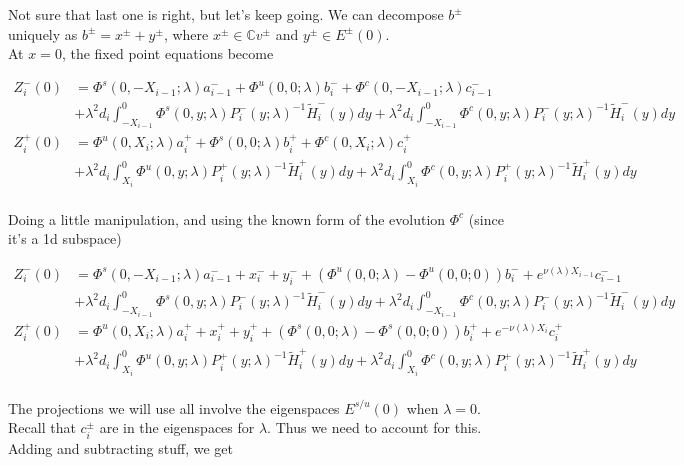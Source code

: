 \documentclass[12pt]{article}
\def\C{{\mathbb C}}
\begin{document}
Not sure that last one is right, but let's keep going. We can decompose $b^\pm$ uniquely as $b^\pm = x^\pm + y^\pm$, where $x^\pm \in \C v^\pm$ and $y^\pm \in E^\pm(0)$.\\

At $x = 0$, the fixed point equations become

\begin{align*}
Z_i^-(0) &= \Phi^s(0, -X_{i-1}; \lambda) a_{i-1}^- + \Phi^u(0, 0; \lambda) b_i^- + \Phi^c(0, -X_{i-1}; \lambda) c_{i-1}^- \\
&+ \lambda^2 d_i \int_{-X_{i-1}}^0 \Phi^s(0, y; \lambda) P_i^-(y; \lambda)^{-1} \tilde{H}_i^-(y) dy 
+ \lambda^2 d_i \int_{-X_{i-1}}^0 \Phi^c(0, y; \lambda) P_i^-(y; \lambda)^{-1} \tilde{H}_i^-(y) dy  \\ 
Z_i^+(0) &= \Phi^u(0, X_i; \lambda) a_i^+ + \Phi^s(0, 0; \lambda) b_i^+ + \Phi^c(0, X_i; \lambda) c_i^+ \\
&+ \lambda^2 d_i \int_{X_i}^0 \Phi^u(0, y; \lambda) P_i^+(y; \lambda)^{-1} \tilde{H}_i^+(y) dy 
+ \lambda^2 d_i \int_{X_i}^0 \Phi^c(0, y; \lambda) P_i^+(y; \lambda)^{-1} \tilde{H}_i^+(y) dy \\
\end{align*}

Doing a little manipulation, and using the known form of the evolution $\Phi^c$ (since it's a 1d subspace)

\begin{align*}
Z_i^-(0) &= \Phi^s(0, -X_{i-1}; \lambda) a_{i-1}^- + x_i^- + y_i^- + (\Phi^u(0, 0; \lambda) - \Phi^u(0, 0; 0))b_i^- + e^{\nu(\lambda) X_{i-1}} c_{i-1}^- \\
&+ \lambda^2 d_i \int_{-X_{i-1}}^0 \Phi^s(0, y; \lambda) P_i^-(y; \lambda)^{-1} \tilde{H}_i^-(y) dy 
+ \lambda^2 d_i \int_{-X_{i-1}}^0 \Phi^c(0, y; \lambda) P_i^-(y; \lambda)^{-1} \tilde{H}_i^-(y) dy  \\ 
Z_i^+(0) &= \Phi^u(0, X_i; \lambda) a_i^+ + x_i^+ + y_i^+ + (\Phi^s(0, 0; \lambda) - \Phi^s(0, 0; 0)) b_i^+ + e^{-\nu(\lambda)X_i} c_i^+ \\
&+ \lambda^2 d_i \int_{X_i}^0 \Phi^u(0, y; \lambda) P_i^+(y; \lambda)^{-1} \tilde{H}_i^+(y) dy 
+ \lambda^2 d_i \int_{X_i}^0 \Phi^c(0, y; \lambda) P_i^+(y; \lambda)^{-1} \tilde{H}_i^+(y) dy \\
\end{align*}

The projections we will use all involve the eigenspaces $E^{s/u}(0)$ when $\lambda = 0$. Recall that $c_i^\pm$ are in the eigenspaces for $\lambda$. Thus we need to account for this. Adding and subtracting stuff, we get
\end{document}
